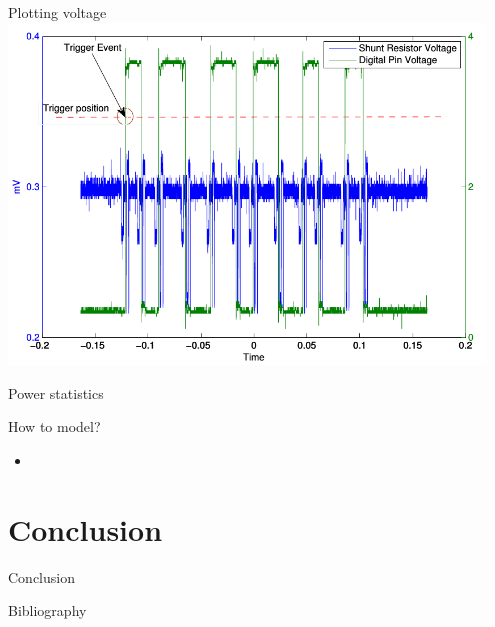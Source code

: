 \documentclass[presentation, bigger]{beamer}
\begin{document}
\begin{frame}[label=sec-3-4]{Plotting voltage}
\includegraphics[width=0.95\textwidth,keepaspectration=true]{energy_measurement_plot}
\end{frame}
\begin{frame}[label=sec-3-5]{Power statistics}
\end{frame}
\begin{frame}[label=sec-3-6]{How to model?}
\begin{itemize}
\item 
\end{itemize}
\end{frame}
\section{Conclusion}
\label{sec-4}
\begin{frame}[label=sec-4-1]{Conclusion}
\end{frame}
\begin{frame}[label=sec-4-2]{Bibliography}
\nocite{*}
\printbibliography
\end{frame}
\end{document}
